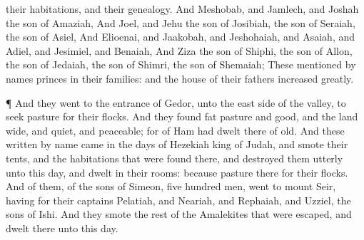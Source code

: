 {{} their
habitations, and their
genealogy.
And
Meshobab, and
Jamlech, and
Joshah the
son of
Amaziah,
And
Joel, and
Jehu the
son of
Josibiah, the
son of
Seraiah, the
son of
Asiel,
And
Elioenai, and
Jaakobah, and
Jeshohaiah, and
Asaiah, and
Adiel, and
Jesimiel, and
Benaiah,
And
Ziza the
son of
Shiphi, the
son of
Allon, the
son of
Jedaiah, the
son of
Shimri, the
son of
Shemaiah;
These
mentioned by
{}
names
{}
princes in their
families: and the
house of their
fathers
increased
greatly.
\par }{\PP {}¶ And they
went to the
entrance of
Gedor,
{} unto the east
side of the
valley, to
seek
pasture for their
flocks.
And they
found
fat
pasture and
good, and the
land
{}
wide, and
quiet, and
peaceable; for
{} of
Ham had
dwelt there of
old.
And these
written by
name
came in the
days of
Hezekiah
king of
Judah, and
smote their
tents, and the
habitations that were
found there, and
destroyed them utterly unto this
day, and
dwelt in their rooms: because
{}
pasture there for their
flocks.
And
{} of them,
{} of the
sons of
Simeon,
five
hundred
men,
went to
mount
Seir, having for their
captains
Pelatiah, and
Neariah, and
Rephaiah, and
Uzziel, the
sons of
Ishi.
And they
smote the
rest of the
Amalekites that were
escaped, and
dwelt there unto this
day.

}
